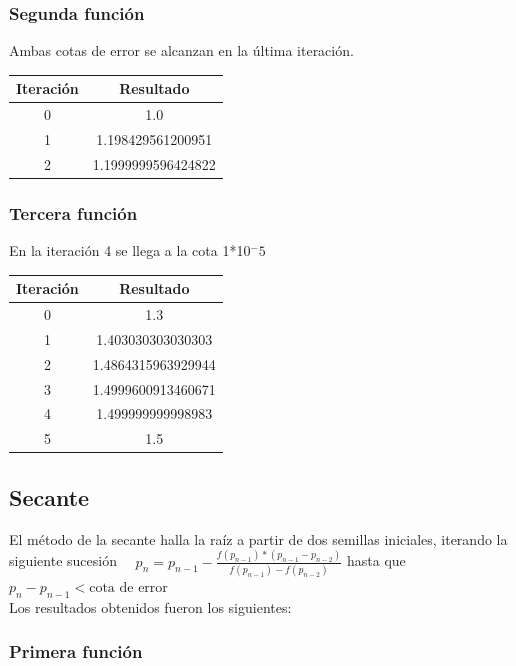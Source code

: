 \documentclass[titlepage,a4paper]{article}
\begin{document}
\subsubsection{Segunda función}\label{sec:NRM2}
Ambas cotas de error se alcanzan en la última iteración.
\begin{center}
    \begin{tabular}{| c | c |}
    \hline
     Iteración & Resultado \\ \hline
  0     &  1.0 \\
1     &  1.198429561200951 \\
2     &  1.1999999596424822 \\
    \hline
    \end{tabular}
\end{center}
\subsubsection{Tercera función}\label{sec:NRM3}
En la iteración 4 se llega a la cota 1*10$^-5$
\begin{center}
    \begin{tabular}{| c | c |}
    \hline
     Iteración & Resultado \\ \hline
  0     &  1.3 \\
1     &  1.403030303030303 \\
2     &  1.4864315963929944 \\
3     &  1.4999600913460671 \\
4     &  1.499999999998983 \\
5     &  1.5 \\
    \hline
    \end{tabular}
\end{center}

\subsection{Secante}\label{sec:biseccion}
El método de la secante halla la raíz a partir de dos semillas iniciales, iterando la siguiente sucesión
$\quad p_{n} =p_{n-1}-\frac{f (p_{n-1})*(p_{n-1}-p_{n-2})}{f(p_{n-1})-f(p_{n-2})}$ hasta que $p_{n}-p_{n-1} < \mbox{cota de error}$
\\

Los resultados obtenidos fueron los siguientes:

\subsubsection{Primera función}\label{sec:sec1}
\end{document}
